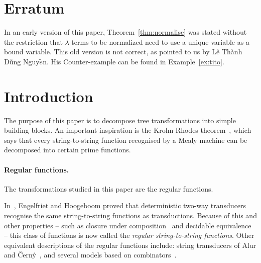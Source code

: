 
\section{Erratum}
In an early version of this paper, Theorem~\ref{thm:normalise} was stated without the restriction that $\lambda$-terms to be normalized need to use a unique variable as a bound variable. This old version is not correct, as pointed to us by Lê Thành Dũng Nguy$\tilde e$n. His Counter-example can be found in Example~\ref{ex:tito}.

\section{Introduction}

The purpose of this paper is to decompose tree transformations into simple building blocks. An important inspiration  is the Krohn-Rhodes theorem~\cite[p.~454]{Krohn1965}, which says that every string-to-string function recognised by a Mealy machine can be decomposed into certain prime functions. 

\paragraph*{Regular functions.} The transformations studied in this paper are the  regular functions.

In~\cite[Theorem 13]{engelfrietMSODefinableString2001}, Engelfriet and Hoogeboom proved that deterministic two-way transducers recognise the same string-to-string functions as \mso transductions. Because of this and other properties -- such as closure under composition~\cite[Theorem 1]{chytilSerialComposition2Way1977} and decidable equivalence~\cite[Theorem 1]{gurariEquivalenceProblemDeterministic1982} --  this class of functions is now called the \emph{regular string-to-string functions}. Other  equivalent descriptions of the regular functions include: string transducers of Alur and {\v C}ern{\'y}~\cite{alurExpressivenessStreamingString2010}, and several models based on combinators~\cite{alur2014regular,daveGastinKrishna18, bojanczykRegularFirstOrderList2018}. 
 

